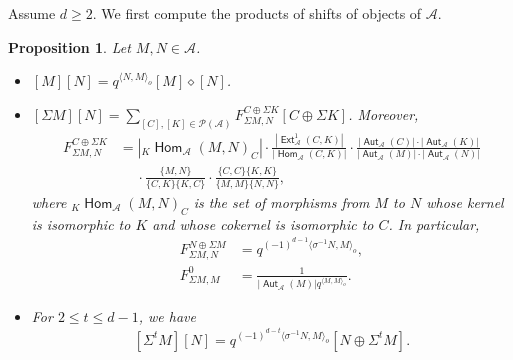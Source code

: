 \documentclass[reqno,12pt,a4paper]{amsart}
\newtheorem{proposition}[theorem]{Proposition}
\theoremstyle{remark}
\theoremstyle{definition}
\newcommand{\opname}[1]{\operatorname{\mathsf{#1}}}
\newcommand{\Hom}{\opname{Hom}}
\newcommand{\Aut}{\opname{Aut}}
\newcommand{\Ext}{\opname{Ext}}
\newcommand{\ca}{{\mathcal A}}
\newcommand{\cp}{{\mathcal P}}
\numberwithin{equation}{section}
\begin{document}
Assume $d\geq 2$. We first compute the products of shifts of objects of $\ca$.

\begin{proposition}
\label{prop:Hall-subalgebra-in-root-category}
Let $M,N\in\ca$.
\begin{itemize}
\item[(a)] $[M][N]=q^{\langle N,M\rangle_o}[M]\diamond[N]$.
\item[(b)] $[\Sigma M][N]=\sum_{[C],[K]\in\cp(\ca)}F_{\Sigma M,N}^{C\oplus \Sigma K}[C\oplus \Sigma K]$. Moreover,
\begin{align*}
F_{\Sigma M,N}^{C\oplus \Sigma K}&=|{}_K\Hom_\ca(M,N)_C|\cdot\frac{|\Ext^1_\ca(C,K)|}{|\Hom_\ca(C,K)|}\cdot\frac{|\Aut_\ca(C)|\cdot |\Aut_\ca(K)|}{|\Aut_\ca(M)|\cdot |\Aut_\ca(N)|}\\
&\hspace{15pt}\cdot\frac{\{M,N\}}{\{C,K\}\{K,C\}}\cdot \frac{\{C,C\}\{K,K\}}{\{M,M\}\{N,N\}},
\end{align*}
where ${}_K\Hom_\ca(M,N)_C$ is the set of morphisms from $M$ to $N$ whose kernel is isomorphic to $K$ and whose cokernel is isomorphic to $C$. In particular,
\begin{align*}
F_{\Sigma M,N}^{N\oplus\Sigma M}&=q^{(-1)^{d-1}\langle \sigma^{-1}N,M\rangle_o},\\
F_{\Sigma M,M}^0&=\frac{1}{|\Aut_\ca(M)|q^{\langle M,M\rangle_o}}.
\end{align*}
\item[(c)] For $2\leq t\leq d-1$, we have
\[
[\Sigma^t M][N]=q^{(-1)^{{d-t}}\langle \sigma^{-1}N,M\rangle_o}[N\oplus \Sigma^t M].
\]
\end{itemize}
\end{proposition}
\end{document}
